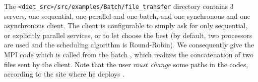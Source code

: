The \verb!<diet_src>/src/examples/Batch/file_transfer! directory 
contains 3 servers, one sequential, one parallel and one batch, and one 
synchronous and one asynchronous
client. The client is configurable to simply ask for only sequential, or
explicitly parallel services, or to let \diet choose the best (by default, two
processors are used and the scheduling algorithm is Round-Robin). We
consequently give the MPI code which is called from the batch \sed, which
realizes the concatenation of two files sent by the client. Note that the user
{\it must change} some paths in the \sed codes, according to the site where he
deploys \diet. 



%   


%   


%   


